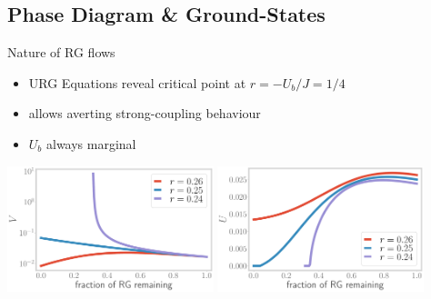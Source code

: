 \documentclass[8pt,aspectratio=169]{beamer}
\newcommand{\nitem}{\item[\ding{51}]}
\begin{document}
\begin{frame}{}
\section{Phase Diagram \& Ground-States}
\end{frame}

\begin{frame}{Nature of RG flows}

\begin{itemize}
\nitem URG Equations reveal \alert{critical} point at  \(r = -U_b / J = 1/4\)\\[10pt]
\nitem allows averting strong-coupling behaviour\\[10pt]
\nitem \(U_b\) always marginal
\end{itemize}

\vspace*{\fill}

\includegraphics[width=0.45\textwidth]{V_Ub.pdf}
\hspace*{\fill}
\includegraphics[width=0.45\textwidth]{U_Ub.pdf}

\end{frame}
\end{document}
